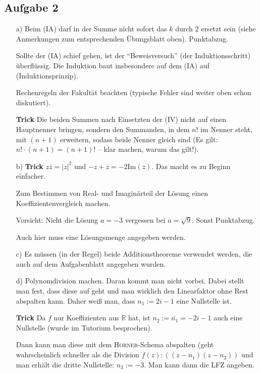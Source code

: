 \documentclass[11pt, a4paper]{article}
\newcommand{\R}{\mathbb{R}}
\begin{document}
\subsection*{Aufgabe 2}
\begin{itemize}
\item[a)] Beim (IA) darf in der Summe nicht sofort das $k$ durch $2$ ersetzt sein (siehe Anmerkungen zum entsprechenden Übungsblatt oben). Punktabzug.

Sollte der (IA) schief gehen, ist der \enquote{Beweisversuch} (der Induktionsschritt) überflüssig. Die Induktion baut insbesondere auf dem (IA) auf (Induktionsprinzip).

Rechenregeln der Fakultät beachten (typische Fehler sind weiter oben schon diskutiert). 

\textbf{Trick} Die beiden Summen nach Einsetzten der (IV) nicht auf einen Hauptnenner bringen, sondern den Summanden, in dem $n!$ im Nenner steht, mit $(n+1)$ erweitern, sodass beide Nenner gleich sind (Es gilt: $n! \cdot (n+1) = (n+1)!$ -- klar machen, warum das gilt!).

\item[b)] \textbf{Trick} $z\overline{z} = |z|^2$ und $-z+\overline{z} = -2\text{Im}(z)$. Das macht es zu Beginn einfacher. 

Zum Bestimmen von Real- und Imaginärteil der Lösung einen Koeffizientenvergleich machen.

Vorsicht: Nicht die Lösung $a = -3$ vergessen bei $a = \sqrt{9}$. Sonst Punktabzug.

Auch hier muss eine Lösungsmenge angegeben werden.

\item[c)] Es müssen (in der Regel) beide Additionstheoreme verwendet werden, die auch auf dem Aufgabenblatt angegeben wurden.

\item[d)] Polynomdivision machen. Daran kommt man nicht vorbei. Dabei stellt man fest, dass diese auf geht und man wirklich den Linearfaktor ohne Rest abspalten kann. Daher weiß man, dass $n_1 := 2i - 1$ eine Nullstelle ist.

\textbf{Trick} Da $f$ nur Koeffizienten aus $\R$ hat, ist $n_2 := \overline{n_1} = -2i - 1$ auch eine Nullstelle (wurde im Tutorium besprochen).

Dann kann man diese mit dem \textsc{Horner}-Schema abspalten (geht wahrscheinlich schneller als die Division $f(z) : ((z - n_1)(z - n_2))$ und man erhält die dritte Nullstelle: $n_3 := -3$. Man kann dann die LFZ angeben. 


\end{itemize}
\end{document}
